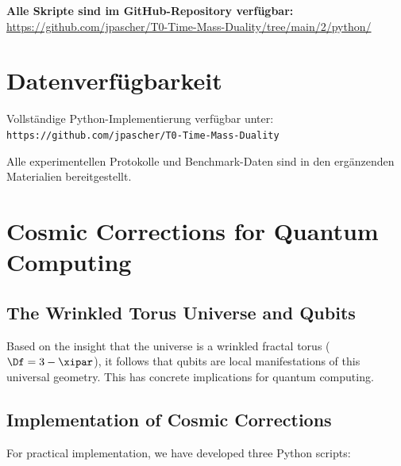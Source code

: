 \textbf{Alle Skripte sind im GitHub-Repository verfügbar:} \\
\url{https://github.com/jpascher/T0-Time-Mass-Duality/tree/main/2/python/}

\section*{Datenverfügbarkeit}

Vollständige Python-Implementierung verfügbar unter: \\
\texttt{https://github.com/jpascher/T0-Time-Mass-Duality}

Alle experimentellen Protokolle und Benchmark-Daten sind in den ergänzenden Materialien bereitgestellt.


\section{Cosmic Corrections for Quantum Computing}
\label{sec:cosmic_corrections}

\subsection{The Wrinkled Torus Universe and Qubits}

Based on the insight that the universe is a wrinkled fractal torus
($\Df = 3 - \xipar$), it follows that qubits are local manifestations of this
universal geometry. This has concrete implications for quantum computing.

\subsection{Implementation of Cosmic Corrections}

For practical implementation, we have developed three Python scripts:

